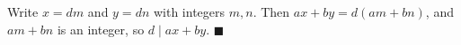 Write $x=dm$ and $y=dn$ with integers $m,n$. Then $ax+by=d(am+bn)$, and $am+bn$ is an integer, so $d\mid ax+by$. $\blacksquare$
